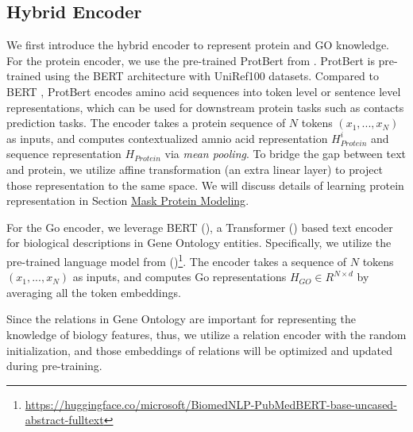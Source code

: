 \subsection{Hybrid Encoder}
We first introduce the hybrid encoder to represent protein and GO knowledge. 
For the protein encoder, we use the pre-trained ProtBert from \cite{DBLP:journals/corr/abs-2007-06225}.
ProtBert is pre-trained using the BERT architecture with UniRef100 datasets.
Compared to BERT \cite{DBLP:conf/naacl/DevlinCLT19}, ProtBert encodes amino acid sequences into token level or sentence level representations, which can be used for downstream protein tasks such as contacts prediction tasks.
The encoder  takes a protein sequence of $N$ tokens $(x_1,...,x_N)$ as inputs, and computes contextualized amnio acid representation $H_{Protein}^{i}$ and sequence representation $H_{Protein}$ 
{\color{highlight}via \textit{mean pooling}. 
To bridge the gap between text and protein, we utilize affine transformation (an extra linear layer) to project those representation to the same space.}
We will discuss details of learning protein representation in Section \hyperref[sec:MLM]{Mask Protein Modeling}.

For the Go encoder, we leverage BERT (\cite{DBLP:conf/naacl/DevlinCLT19}), a Transformer (\cite{DBLP:conf/nips/VaswaniSPUJGKP17}) based text encoder for biological  descriptions in Gene Ontology entities.
Specifically, we utilize the pre-trained language model from (\cite{pubmedbert})\footnote{\url{https://huggingface.co/microsoft/BiomedNLP-PubMedBERT-base-uncased-abstract-fulltext}}.
The encoder takes a sequence of $N$ tokens $(x_1,...,x_N)$ as inputs, and computes  Go representations $H_{GO}\in R^{N\times d}$  by averaging all the token embeddings.

Since the relations in Gene Ontology are important for representing the knowledge of biology features, thus, we utilize a relation encoder with the random initialization, and those embeddings of relations will be optimized and updated during pre-training.

 
